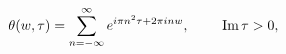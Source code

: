 \begin{equation}
\theta(w,\tau)=
\sum_{n=-\infty}^\infty
e^{i\pi n^2\tau+2\pi in w},
~~~~~~~\hbox{Im}\,\tau>0,\end{equation}

